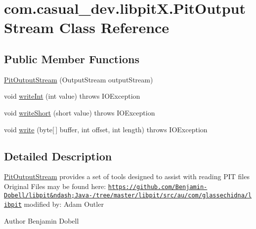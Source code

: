 \hypertarget{classcom_1_1casual__dev_1_1libpitX_1_1PitOutputStream}{\section{com.\-casual\-\_\-dev.\-libpit\-X.\-Pit\-Output\-Stream Class Reference}
\label{classcom_1_1casual__dev_1_1libpitX_1_1PitOutputStream}
}
\subsection*{Public Member Functions}
\begin{DoxyCompactItemize}
\item 
\hyperlink{classcom_1_1casual__dev_1_1libpitX_1_1PitOutputStream_a7c3f262a5f0d7b76fccffbba7e0afff0}{Pit\-Output\-Stream} (Output\-Stream output\-Stream)
\item 
void \hyperlink{classcom_1_1casual__dev_1_1libpitX_1_1PitOutputStream_a094d01007eb76a2e312957b2d2870585}{write\-Int} (int value)  throws I\-O\-Exception 
\item 
void \hyperlink{classcom_1_1casual__dev_1_1libpitX_1_1PitOutputStream_af4474cce8b6b608319637e90952cd47f}{write\-Short} (short value)  throws I\-O\-Exception 
\item 
void \hyperlink{classcom_1_1casual__dev_1_1libpitX_1_1PitOutputStream_acb35ed536a973095da6c442c763b9953}{write} (byte\mbox{[}$\,$\mbox{]} buffer, int offset, int length)  throws I\-O\-Exception 
\end{DoxyCompactItemize}


\subsection{Detailed Description}
\hyperlink{classcom_1_1casual__dev_1_1libpitX_1_1PitOutputStream}{Pit\-Output\-Stream} provides a set of tools designed to assist with reading P\-I\-T files Original Files may be found here\-: \href{https://github.com/Benjamin-Dobell/libpit&ndash;Java-/tree/master/libpit/src/au/com/glassechidna/libpit}{\tt https\-://github.\-com/\-Benjamin-\/\-Dobell/libpit\&ndash;\-Java-\//tree/master/libpit/src/au/com/glassechidna/libpit} modified by\-: Adam Outler

\begin{DoxyAuthor}{Author}
Benjamin Dobell 
\end{DoxyAuthor}


